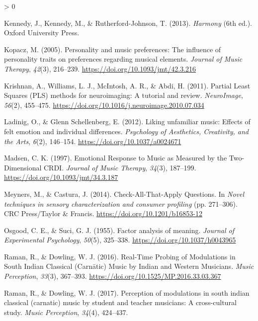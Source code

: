 \documentclass[
  english,
  man,floatsintext]{apa6}
\newlength{\cslhangindent}
\newenvironment{CSLReferences}[2] %
 {%
  \setlength{\parindent}{0pt}
  \ifodd #1 \everypar{\setlength{\hangindent}{\cslhangindent}}\ignorespaces\fi
  \ifnum #2 > 0
  \setlength{\parskip}{#2\baselineskip}
  \fi
 }%
 {}
\begin{document}
\begin{CSLReferences}{1}{0}
\leavevmode\hypertarget{ref-Kennedy2013}{}%
Kennedy, J., Kennedy, M., \& Rutherford-Johnson, T. (2013). \emph{Harmony} (6th ed.). Oxford University Press.

\leavevmode\hypertarget{ref-Kopacz2005}{}%
Kopacz, M. (2005). {Personality and music preferences: The influence of personality traits on preferences regarding musical elements}. \emph{Journal of Music Therapy}, \emph{42}(3), 216--239. \url{https://doi.org/10.1093/jmt/42.3.216}

\leavevmode\hypertarget{ref-Krishnan2011}{}%
Krishnan, A., Williams, L. J., McIntosh, A. R., \& Abdi, H. (2011). {Partial Least Squares (PLS) methods for neuroimaging: A tutorial and review}. \emph{NeuroImage}, \emph{56}(2), 455--475. \url{https://doi.org/10.1016/j.neuroimage.2010.07.034}

\leavevmode\hypertarget{ref-Ladinig2012}{}%
Ladinig, O., \& Glenn Schellenberg, E. (2012). {Liking unfamiliar music: Effects of felt emotion and individual differences}. \emph{Psychology of Aesthetics, Creativity, and the Arts}, \emph{6}(2), 146--154. \url{https://doi.org/10.1037/a0024671}

\leavevmode\hypertarget{ref-Madsen1997}{}%
Madsen, C. K. (1997). {Emotional Response to Music as Measured by the Two-Dimensional CRDI}. \emph{Journal of Music Therapy}, \emph{34}(3), 187--199. \url{https://doi.org/10.1093/jmt/34.3.187}

\leavevmode\hypertarget{ref-Meyners2014}{}%
Meyners, M., \& Castura, J. (2014). {Check-All-That-Apply Questions}. In \emph{Novel techniques in sensory characterization and consumer profiling} (pp. 271--306). CRC Press/Taylor {\&} Francis. \url{https://doi.org/10.1201/b16853-12}

\leavevmode\hypertarget{ref-Osgood1955}{}%
Osgood, C. E., \& Suci, G. J. (1955). {Factor analysis of meaning}. \emph{Journal of Experimental Psychology}, \emph{50}(5), 325--338. \url{https://doi.org/10.1037/h0043965}

\leavevmode\hypertarget{ref-Raman2016}{}%
Raman, R., \& Dowling, W. J. (2016). {Real-Time Probing of Modulations in South Indian Classical (Carnātic) Music by Indian and Western Musicians}. \emph{Music Perception}, \emph{33}(3), 367--393. \url{https://doi.org/10.1525/MP.2016.33.03.367}

\leavevmode\hypertarget{ref-Raman2017}{}%
Raman, R., \& Dowling, W. J. (2017). {Perception of modulations in south indian classical (carnatic) music by student and teacher musicians: A cross-cultural study}. \emph{Music Perception}, \emph{34}(4), 424--437.


\end{CSLReferences}
\end{document}
